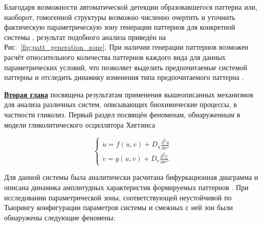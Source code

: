 Благодаря возможности автоматической детекции образовавшегося паттерна или, наоборот, гомогенной структуры возможно численно очертить и уточнить фактическую параметрическую зону генерации  паттернов для конкретной системы \cite{bib2}, результат подобного анализа приведён на Рис.~\ref{fig:patt_generation_zone}. При наличии генерации паттернов возможен расчёт относительного количества паттернов каждого вида для данных параметрических условий, что позволяет выделить предпочитаемые системой паттерны и отследить динамику изменения типа предпочитаемого паттерна \cite{bib4}.

\begin{figure}[ht]
\end{figure}

\underline{\textbf{Вторая глава}} посвящена результатам применения вышеописанных механизмов для анализа различных систем, описывающих биохимические процессы, в частности гликолиз. Первый раздел посвящён феноменам, обнаруженным в модели гликолитического осциллятора Хиггинса \cite{higgins1964chemical}

\begin{equation}
    \left\{\begin{array}{l}
        \dot{u}=f(u, v)+D_u \frac{\partial^2 u}{\partial x^2} \\
        \dot{v}=g(u, v)+D_v \frac{\partial^2 v}{\partial x^2} .
        \end{array}\right.
\end{equation}

Для данной системы была аналитически расчитана бифуркационная диаграмма и описана динамика амплитудных характеристик формируемых паттернов \cite{bib1}. При исследовании параметрической зоны, соответствующей неустойчивой по Тьюрингу конфигурации параметров системы и смежных с ней зон были обнаружены следующие феномены:

